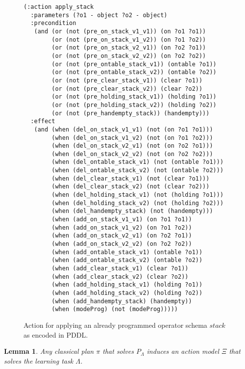 \documentclass[letterpaper]{article} %
\newtheorem{lemma}[theorem]{Lemma}
\begin{document}
\begin{figure}[hbt]
\begin{scriptsize}
\begin{verbatim}
(:action apply_stack
  :parameters (?o1 - object ?o2 - object)
  :precondition
   (and (or (not (pre_on_stack_v1_v1)) (on ?o1 ?o1))
        (or (not (pre_on_stack_v1_v2)) (on ?o1 ?o2))
        (or (not (pre_on_stack_v2_v1)) (on ?o2 ?o1))
        (or (not (pre_on_stack_v2_v2)) (on ?o2 ?o2))
        (or (not (pre_ontable_stack_v1)) (ontable ?o1))
        (or (not (pre_ontable_stack_v2)) (ontable ?o2))
        (or (not (pre_clear_stack_v1)) (clear ?o1))
        (or (not (pre_clear_stack_v2)) (clear ?o2))
        (or (not (pre_holding_stack_v1)) (holding ?o1))
        (or (not (pre_holding_stack_v2)) (holding ?o2))
        (or (not (pre_handempty_stack)) (handempty)))
  :effect
   (and (when (del_on_stack_v1_v1) (not (on ?o1 ?o1)))
        (when (del_on_stack_v1_v2) (not (on ?o1 ?o2)))
        (when (del_on_stack_v2_v1) (not (on ?o2 ?o1)))
        (when (del_on_stack_v2_v2) (not (on ?o2 ?o2)))
        (when (del_ontable_stack_v1) (not (ontable ?o1)))
        (when (del_ontable_stack_v2) (not (ontable ?o2)))
        (when (del_clear_stack_v1) (not (clear ?o1)))
        (when (del_clear_stack_v2) (not (clear ?o2)))
        (when (del_holding_stack_v1) (not (holding ?o1)))
        (when (del_holding_stack_v2) (not (holding ?o2)))
        (when (del_handempty_stack) (not (handempty)))
        (when (add_on_stack_v1_v1) (on ?o1 ?o1))
        (when (add_on_stack_v1_v2) (on ?o1 ?o2))
        (when (add_on_stack_v2_v1) (on ?o2 ?o1))
        (when (add_on_stack_v2_v2) (on ?o2 ?o2))
        (when (add_ontable_stack_v1) (ontable ?o1))
        (when (add_ontable_stack_v2) (ontable ?o2))
        (when (add_clear_stack_v1) (clear ?o1))
        (when (add_clear_stack_v2) (clear ?o2))
        (when (add_holding_stack_v1) (holding ?o1))
        (when (add_holding_stack_v2) (holding ?o2))
        (when (add_handempty_stack) (handempty))
        (when (modeProg) (not (modeProg)))))
\end{verbatim}
\end{scriptsize}
 \caption{\small Action for applying an already programmed operator schema $stack$ as encoded in PDDL.}
\label{fig:compilation}
\end{figure}


\begin{lemma}
Any classical plan $\pi$ that solves $P_{\Lambda}$ induces an action model $\Xi$ that solves the learning task $\Lambda$.
\end{lemma}
\end{document}
